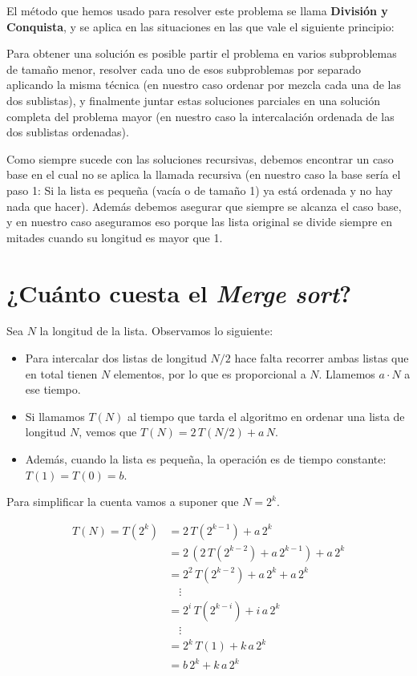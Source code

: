 \begin{sabias_que}
El método que hemos usado para resolver este problema se llama {\bf División y
Conquista}, y se aplica en las situaciones en las que vale el siguiente
principio:

Para obtener una solución es posible partir el problema en varios subproblemas
de tamaño menor, resolver cada uno de esos subproblemas por separado aplicando
la misma técnica (en nuestro caso ordenar por mezcla cada una de las dos
sublistas), y finalmente juntar estas soluciones parciales en una solución
completa del problema mayor (en nuestro caso la intercalación ordenada de las
dos sublistas ordenadas).

Como siempre sucede con las soluciones recursivas, debemos encontrar un caso
base en el cual no se aplica la llamada recursiva (en nuestro caso la base
sería el paso 1: Si la lista es pequeña (vacía o de tamaño 1) ya está ordenada
y no hay nada que hacer). Además debemos asegurar que siempre se alcanza el
caso base, y en nuestro caso aseguramos eso porque las lista original se divide
siempre en mitades cuando su longitud es mayor que 1.
\end{sabias_que}

\section{¿Cuánto cuesta el {\it Merge sort}?}
Sea $N$ la longitud de la lista. Observamos lo siguiente:
\begin{itemize}

\item Para intercalar dos listas de longitud $N/2$ hace falta recorrer
ambas listas que en total tienen $N$ elementos, por lo que es proporcional
a $N$. Llamemos $a \cdot N$ a ese tiempo.

\item Si llamamos $T(N)$ al tiempo que tarda el algoritmo en ordenar
una lista de longitud $N$, vemos que $T(N) = 2 \, T(N/2) + a \, N$.

\item Además, cuando la lista es pequeña, la operación es de tiempo
constante: $T(1) = T(0) = b$.
\end{itemize}

Para simplificar la cuenta vamos a suponer que $N = 2^k$.

\begin{align*}
T(N) = T(2^k) &= 2 \, T(2^{k-1}) + a \, 2^k \\
              &= 2 \, \left( 2 \, T(2^{k-2} ) + a \, 2^{k-1} \right) + a \, 2^k\\
&= 2^2 \, T(2^{k-2} ) + a \, 2^k +a \, 2^k\\
&\quad\vdots\\
&= 2^i \, T(2^{k-i})+ i \, a \, 2^k\\
&\quad\vdots\\
&= 2^k \, T(1) + k \, a \, 2^k\\
&= b \, 2^k  + k \, a \, 2^k
\end{align*}

